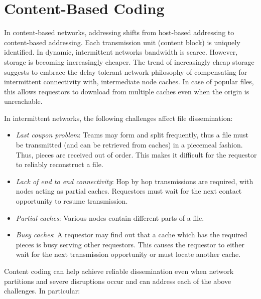 \section{Content-Based Coding}
In content-based networks, addressing shifts from host-based addressing to content-based addressing. Each transmission unit (content block) is uniquely identified. In dynamic, intermittent  networks bandwidth is scarce. However, storage is becoming increasingly cheaper. The trend of increasingly cheap storage suggests to embrace the delay tolerant network philosophy of compensating for intermittent connectivity with, intermediate node caches. In case of popular files, this allows requestors to download from multiple caches even when the origin is unreachable.

In intermittent networks, the following challenges affect file dissemination:

\begin{itemize}
  \item \emph{Last coupon problem}: Teams may form and split frequently, thus a file must be transmitted (and can be retrieved from caches) in a piecemeal fashion. Thus, pieces are received out of order. This makes it difficult for the requestor to reliably reconstruct a file.
  \item \emph{Lack of end to end connectivity}: Hop by hop transmissions are required, with nodes acting as partial caches. Requestors must wait for the next contact opportunity to resume transmission.
  \item \emph{Partial caches}: Various nodes contain different parts of a file.
  \item \emph{Busy caches}: A requestor may find out that a cache which has the required pieces is busy serving other requestors. This causes the requestor to either wait for the next transmission opportunity or must locate another cache.
\end{itemize}

Content coding can help achieve reliable dissemination even when network partitions and severe disruptions occur and can address each of the above challenges. In particular:

